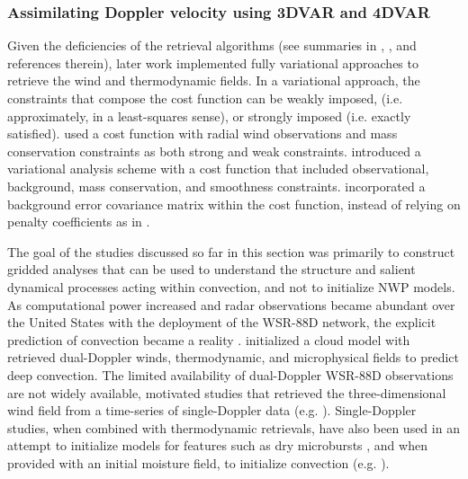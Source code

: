 \subsubsection{Assimilating Doppler velocity using 3DVAR and 4DVAR}
Given the deficiencies of the retrieval algorithms (see summaries in \citealt{shapiromewes99}, \citealt{gaoetal99}, and references therein), later work implemented fully variational approaches to retrieve the wind and thermodynamic fields. In a variational approach, the constraints that compose the cost function can be weakly imposed, (i.e. approximately, in a least-squares sense), or strongly imposed (i.e. exactly satisfied). \citet{shapiromewes99} used a cost function with radial wind observations and mass conservation constraints as both strong and weak constraints. \citet{gaoetal99} introduced a variational analysis scheme with a cost function that included observational, background, mass conservation, and smoothness constraints. \citet{gaoetal04} incorporated a background error covariance matrix within the cost function, instead of relying on penalty coefficients as in \citet{gaoetal99}.

The goal of the studies discussed so far in this section was primarily to construct gridded analyses that can be used to understand the structure and salient dynamical processes acting within convection, and not to initialize NWP models. As computational power increased and radar observations became abundant over the United States with the deployment of the WSR-88D network, the explicit prediction of convection became a reality \citep{lilly90}. \citet{linetal93} initialized a cloud model with retrieved dual-Doppler winds, thermodynamic, and microphysical fields to predict deep convection. The limited availability of dual-Doppler WSR-88D observations are not widely available, motivated studies that retrieved the three-dimensional wind field from a time-series of single-Doppler data (e.g. \citealt{shapiroetal95,gaoetal01}). Single-Doppler studies, when combined with thermodynamic retrievals, have also been used in an attempt to initialize models for features such as dry microbursts \citep{crooktuttle94}, and when provided with an initial moisture field, to initialize convection (e.g. \citealt{weygandtetal02a}).

